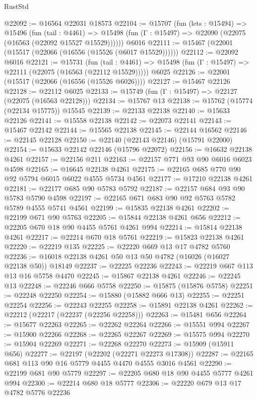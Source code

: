 \begin{lexlean}{RustStd}
\begin{coremodule}
@22092 := @16564 @22031 @18573
@22104 := @15707
    (fun (lets : @15494) =>
    @15496
      (fun (tail : @4461) =>
      @15498 (fun (Γ : @15497) => @22090 (@22075 (@16563 (@22092 @15527 @15529))))))
    @6016
@22111 := @15467 (@22001 (@15517 (@22066 (@16556 (@15526 (@6017 @15529))))))
@22112 := @22092 @6016
@22121 := @15731
    (fun (tail : @4461) => @15498 (fun (Γ : @15497) => @22111 (@22075 (@16563 (@22112 @15529)))))
    @6025
@22126 := @22001 (@15517 (@22066 (@16556 (@15526 @6026))))
@22127 := @15467 @22126
@22128 := @22112 @6025
@22133 := @15749 (fun (Γ : @15497) => @22127 (@22075 (@16563 @22128)))
@22134 := @15767 @13
@22138 := @15762 (@15774 (@22134 @15775)) @15545
@22139 := @22133 @22138
@22140 := @15633 @22126
@22141 := @15558 @22138
@22142 := @22073 @22141
@22143 := @15467 @22142
@22144 := @15565 @22138
@22145 := @22144 @16562
@22146 := @22145 @22128
@22150 := @22140 (@22143 @22146) (@15791 @22000)
@22154 := @15633 @22142 @22146 (@15796 @22072)
@22156 := @16632 @22138 @4261
@22157 := @22156 @211
@22163 := @22157 @771 @93 @90 @6016 @6023 @4598
@22165 := @16645 @22138 @4261
@22175 := @22165 @685 @770 @90 @92 @5794 @6015 @6022 @4555 @5734 @4561
@22177 := @17210 @22138 @4261
@22181 := @22177 @685 @90 @5783 @5792
@22187 := @22157 @684 @93 @90 @5783 @5790 @4598
@22197 := @22165 @671 @683 @90 @92 @5763 @5782 @5789 @4555 @5741 @4561
@22199 := @15835 @22138 @4261
@22202 := @22199 @671 @90 @5763
@22205 := @15844 @22138 @4261 @656
@22212 := @22205 @670 @18 @90 @4455 @5761 @4261 @994
@22214 := @15814 @22138 @4261
@22217 := @22214 @670 @18 @5761
@22219 := @15823 @22138 @4261
@22220 := @22219 @135
@22225 := @22220 @669 @13 @17 @4782 @5760
@22236 := @16018 @22138 @4261 @50 @13 @50 @4782 (@16026 (@16027 @22138 @50)) @18149
@22237 := @22225 @22236
@22243 := @22219 @667 @113 @13 @16 @5758 @4470
@22245 := @15867 @22138 @4261
@22246 := @22245 @13
@22248 := @22246 @666 @5758
@22250 := @15875 (@15876 @5758)
@22251 := @22248 @22250
@22254 := @15880 (@15882 @666 @13)
@22255 := @22251 @22254
@22256 := @22243 @22255
@22258 := @15891 @22138 @4261
@22262 := @22212 (@22217 (@22237 (@22256 @22258)))
@22263 := @15481 @656
@22264 := @15677 @22263
@22265 := @22262 @22264
@22266 := @15551 @994
@22267 := @15900 @22266
@22268 := @22265 @22267
@22269 := @15575 @994
@22270 := @15904 @22269
@22271 := @22268 @22270
@22273 := @15909 (@15911 @656)
@22277 := @22197 (@22202 (@22271 @22273 @17308))
@22287 := @22165 @681 @113 @90 @16 @5779 @4455 @4470 @4555 @3016 @4561
@22290 := @22199 @681 @90 @5779
@22297 := @22205 @680 @18 @90 @4455 @5777 @4261 @994
@22300 := @22214 @680 @18 @5777
@22306 := @22220 @679 @13 @17 @4782 @5776 @22236

\end{coremodule}
\end{lexlean}
